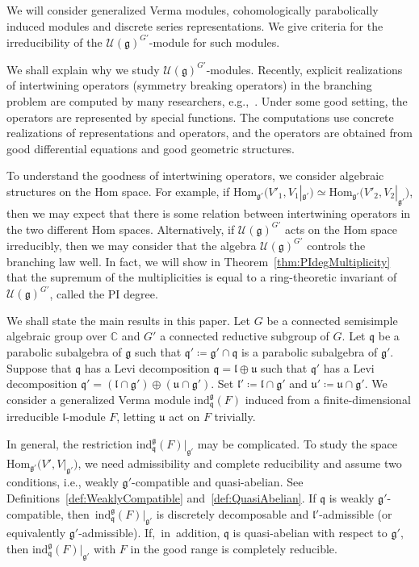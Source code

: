 \documentclass[10pt,a4paper]{amsart}
\numberwithin{equation}{section}
\theoremstyle{definition}
\newcommand{\Hom}{\mathrm{Hom}}
\newcommand{\BasicRing}[1]{\mathbb{#1}}
\newcommand{\CC}{\BasicRing{C}}
\newcommand{\lieC}[1]{\mathfrak{#1}}
\newcommand{\lie}[1]{\mathfrak{#1}}
\newcommand{\univ}[1]{\mathcal{U}(\lieC{#1})}
\newcommand{\ind}[2]{\mathrm{ind}^{\lieC{#1}}_{\lieC{#2}}}
\begin{document}
We will consider generalized Verma modules, cohomologically parabolically induced modules and discrete series representations.
We give criteria for the irreducibility of the $\univ{g}^{G'}$-module for such modules.

We shall explain why we study $\univ{g}^{G'}$-modules.
Recently, explicit realizations of intertwining operators (symmetry breaking operators) in the branching problem are computed by many researchers, e.g.,~\cite{KoPe15_f_method_I,KoPe15_f_method_II,KoSp15_symmetry_breaking}.
Under some good setting, the operators are represented by special functions.
The computations use concrete realizations of representations and operators, and the operators are obtained from good differential equations and good geometric structures.

To understand the goodness of intertwining operators, we consider algebraic structures on the $\Hom$ space.
For example, if $\Hom_{\lie{g'}}\bigl(V'_1, V_1|_{\lie{g'}}\bigr)\simeq \Hom_{\lie{g'}}\bigl(V'_2, V_2|_{\lie{g'}}\bigr)$,
then we may expect that there is some relation between intertwining operators in the two different $\Hom$ spaces.
Alternatively, if $\univ{g}^{G'}$ acts on the $\Hom$ space irreducibly, then we may consider that the algebra $\univ{g}^{G'}$ controls the branching law well.
In fact, we will show in Theorem~\ref{thm:PIdegMultiplicity} that the supremum of the multiplicities is equal to a ring-theoretic invariant of $\univ{g}^{G'}$, called the PI degree.

We shall state the main results in this paper.
Let $G$ be a connected semisimple algebraic group over $\CC$ and $G'$ a connected reductive subgroup of $G$.
Let $\lie{q}$ be a parabolic subalgebra of $\lie{g}$ such that $\lie{q'} \coloneq \lie{g'}\cap \lie{q}$ is a parabolic subalgebra of $\lie{g'}$.
Suppose that $\lie{q}$ has a Levi decomposition $\lie{q} = \lie{l}\oplus \lie{u}$ such that $\lie{q'}$ has a Levi decomposition $\lie{q'} = (\lie{l}\cap \lie{g'}) \oplus (\lie{u} \cap \lie{g'})$.
Set $\lie{l'}\coloneq \lie{l}\cap \lie{g'}$ and $\lie{u}'\coloneq \lie{u} \cap \lie{g'}$.
We consider a generalized Verma module $\ind{g}{q}(F)$ induced from a finite-dimensional irreducible $\lie{l}$-module $F$, letting $\lie{u}$ act on $F$ trivially.

In general, the restriction $\ind{g}{q}(F)|_{\lie{g'}}$ may be complicated.
To study the space $\Hom_{\lie{g'}}\bigl(V', V|_{\lie{g'}}\bigr)$, we need admissibility and complete reducibility
and assume two conditions, i.e., weakly $\lie{g'}$-compatible and quasi-abelian.
See Definitions~\ref{def:WeaklyCompatible} and~\ref{def:QuasiAbelian}.
If $\lie{q}$ is weakly $\lie{g'}$-compatible, then~$\ind{g}{q}(F)|_{\lie{g'}}$ is discretely decomposable and $\lie{l'}$-admissible (or equivalently $\lie{g'}$-admissible).
If,~in~addition, $\lie{q}$ is quasi-abelian with respect to $\lie{g'}$, then $\ind{g}{q}(F)|_{\lie{g'}}$ with $F$ in the good range is completely reducible.
\end{document}
